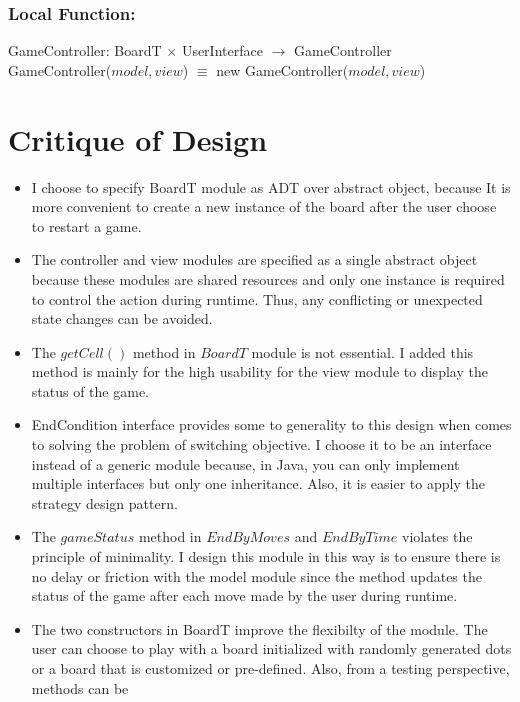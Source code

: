 \documentclass[12pt]{article}
\begin{document}
\subsubsection*{Local Function:}

GameController: BoardT $\times$ UserInterface $\rightarrow$ GameController \\
GameController($model, view$) $\equiv$ new GameController($model, view$)

\newpage

\section*{Critique of Design}

\begin{itemize}
  \item I choose to specify BoardT module as ADT over abstract object, because It is more convenient to create a new instance of the board after the 
        user choose to restart a game.
  \item The controller and view modules are specified as a single abstract object because these modules are shared resources and only one instance is required
        to control the action during runtime. Thus, any conflicting or unexpected state changes can be avoided.
  \item The $getCell()$ method in $BoardT$ module is not essential. I added this method 
        is mainly for the high usability for the view module to display the status of the game.
  \item EndCondition interface provides some to generality to this design when comes to solving the problem of switching objective.
        I choose it to be an interface instead of a generic module because, in Java, you can only implement multiple interfaces but only one inheritance. Also, it 
        is easier to apply the strategy design pattern.
  \item The $gameStatus$ method in $EndByMoves$ and $EndByTime$ violates the principle of minimality. I design this module in this way is to ensure
        there is no delay or friction with the model module since the method updates the status of the game after each move made by the user during runtime.
  \item The two constructors in BoardT improve the flexibilty of the module. The user can choose to play with a board 
        initialized with randomly generated dots or a board that is customized or pre-defined. Also, from a testing perspective, methods can be 

\end{itemize}
\end{document}
